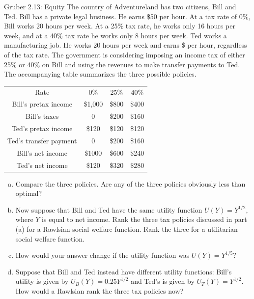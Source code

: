 \documentclass[10pt]{extarticle}
\begin{document}
  \begin{problem}{Gruber 2.13: Equity}
    The country of Adventureland has two citizens, Bill and Ted. Bill has a private legal business. He earns \$50 per hour. At a tax rate of 0\%, Bill works 20 hours per week. At a 25\% tax rate, he works only 16 hours per week, and at a 40\% tax rate he works only 8 hours per week. Ted works a manufacturing job. He works 20 hours per week and earns \$ per hour, regardless of the tax rate. The government is considering imposing an income tax of either 25\% or 40\% on Bill and using the revenues to make transfer payments to Ted. The accompanying table summarizes the three possible policies.
    \begin{center}
      \renewcommand{\arraystretch}{1.5}
      \begin{tabular}{c|c|c|c|}
        \cline{2-4}
        Rate & 0\% & 25\% & 40\% \\
        \cline{2-4}
        Bill's pretax income & \$1,000 & \$800 & \$400 \\
        \cline{2-4}
        Bill's taxes & 0 & \$200 & \$160 \\
        \cline{2-4}
        Ted's pretax income & \$120 & \$120 & \$120 \\
        \cline{2-4}
        Ted's transfer payment & 0 & \$200 & \$160\\
        \cline{2-4}
        Bill's net income & \$1000 & \$600 & \$240\\
        \cline{2-4}
        Ted's net income & \$120 & \$320 & \$280\\
        \cline{2-4}
      \end{tabular}
    \end{center}
    \begin{enumerate}[(a)]
      \item Compare the three policies. Are any of the three policies obviously less than optimal?
      \item Now suppose that Bill and Ted have the same utility function $U(Y) = Y^{1/2}$, where $Y$ is equal to net income. Rank the three tax policies discussed in part (a) for a Rawlsian social welfare function. Rank the three for a utilitarian social welfare function.
      \item How would your answer change if the utility function was $U(Y) = Y^{1/5}$?
      \item Suppose that Bill and Ted instead have different utility functions: Bill's utility is given by $U_B(Y) = 0.25Y^{1/2}$ and Ted's is given by $U_T(Y) = Y^{1/2}$. How would a Rawlsian rank the three tax policies now?

\end{enumerate}
\end{problem}
\end{document}
